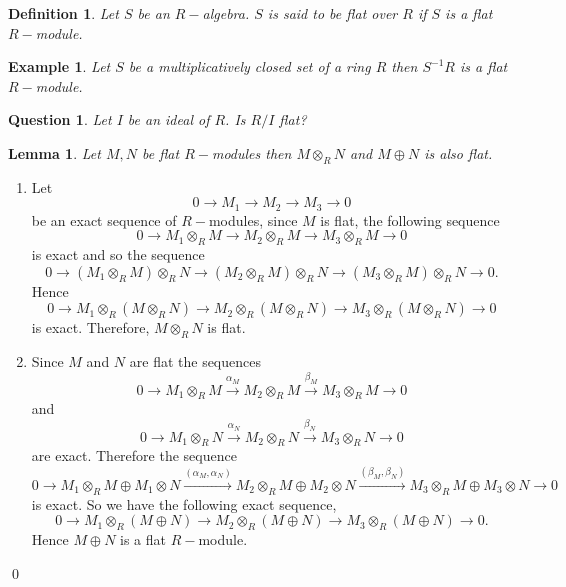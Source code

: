 \documentclass[11pt]{amsart}
\newtheorem{defn}[theorem]{Definition}
\newtheorem{qns}[theorem]{Question}
\newtheorem{eg}[theorem]{Example}
\newtheorem{lemma}[theorem]{Lemma}%
\begin{document}
\begin{defn}

Let $S$ be an $R-$algebra. $S$ is said to be flat over $R$ if $S$ is a flat $R-$module.

\end{defn}

\begin{eg}

Let $S$ be a multiplicatively closed set of a ring $R$ then $S^{-1}R$ is a flat $R-$module.

\end{eg}

\begin{qns}

Let $I$ be an ideal of $R$. Is $R/I$ flat?

\end{qns}

\begin{lemma}

Let $M,N$ be flat $R-$modules then $M\otimes_R N$ and $M\oplus N$ is also flat.

\end{lemma}

\proof \begin{enumerate}
\item Let $$0\to M_1\to M_2\to M_3\to 0$$ be an exact sequence of $R-$modules, since $M$ is flat, the following sequence $$0\to M_1\otimes_R M\to M_2\otimes_R M\to M_3\otimes_R M\to 0$$ is exact and so the sequence $$0\to (M_1\otimes_R M)\otimes_R N\to (M_2\otimes_R M)\otimes_R N\to (M_3\otimes_R M)\otimes_R N\to 0.$$ Hence $$0\to M_1\otimes_R (M\otimes_R N)\to M_2\otimes_R (M\otimes_R N)\to M_3\otimes_R (M\otimes_R N)\to 0$$ is exact. Therefore, $M\otimes_R N$ is flat.\\

\item Since $M$ and $N$ are flat the sequences $$0\to M_1\otimes_R M\xrightarrow{\alpha_M} M_2\otimes_R M\xrightarrow{\beta_M} M_3\otimes_R M\to 0$$ and $$0\to M_1\otimes_R N\xrightarrow{\alpha_N} M_2\otimes_R N\xrightarrow{\beta_N} M_3\otimes_R N\to 0$$ are exact. Therefore the sequence $$0\to M_1\otimes_R M\oplus M_1\otimes N\xrightarrow{(\alpha_M,\alpha_N)} M_2\otimes_R M\oplus M_2\otimes N\xrightarrow{(\beta_M,\beta_N)} M_3\otimes_R M\oplus M_3\otimes N\to 0$$ is exact. So we have the following exact sequence, $$0\to M_1\otimes_R (M\oplus N)\to M_2\otimes_R (M\oplus N)\to M_3\otimes_R (M\oplus N)\to 0.$$
Hence $M\oplus N$ is a flat $R-$module.
\end{enumerate}
\qed
\end{document}
